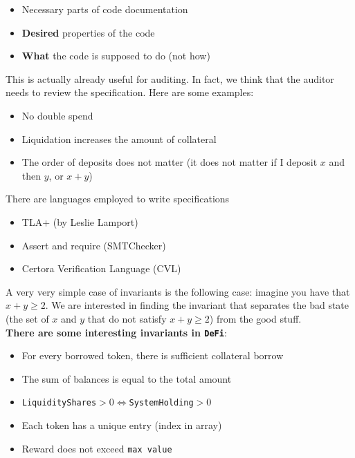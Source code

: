 \documentclass[oneside]{book}
\begin{document}
    \begin{itemize}
        \item Necessary parts of code documentation
        \item\textbf{Desired} properties of the code
        \item\textbf{What} the code is supposed to do (not how)
    \end{itemize}

    This is actually already useful for auditing.
    In fact, we think that the auditor needs to review the specification.
    Here are some examples:

    \begin{itemize}
        \item No double spend
        \item Liquidation increases the amount of collateral
        \item The order of deposits does not matter (it does not matter if I deposit $x$ and then $y$, or $x+y$)
    \end{itemize}

    There are languages employed to write specifications

    \begin{itemize}
        \item TLA+ (by Leslie Lamport)
        \item Assert and require (SMTChecker)
        \item Certora Verification Language (CVL)
    \end{itemize}

    A very very simple case of invariants is the following case: imagine you have that $x+y\geq 2$.
    We are interested in finding the invariant that separates the bad state (the set of $x$ and $y$ that do not satisfy $x+y\geq 2$) from the good stuff.\\

    \textbf{There are some interesting invariants in \texttt{DeFi}}:

    \begin{itemize}
        \item For every borrowed token, there is sufficient collateral borrow
        \item The sum of balances is equal to the total amount
        \item\texttt{LiquidityShares}$>0\Leftrightarrow$\texttt{SystemHolding}$>0$
        \item Each token has a unique entry (index in array)
        \item Reward does not exceed \texttt{max value}
    \end{itemize}
\end{document}
